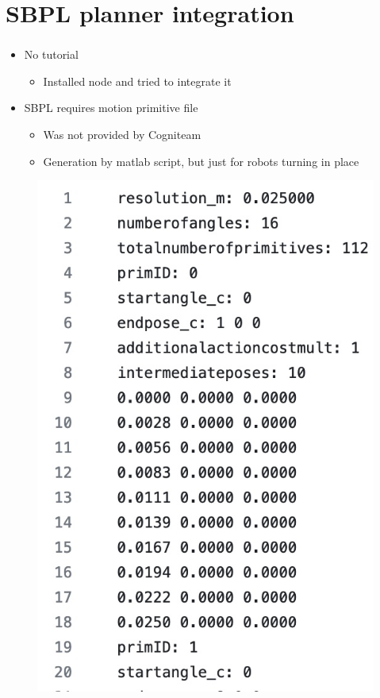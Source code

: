 \documentclass[numberofslides]{AMSBeamer}
\begin{document}
\section{SBPL planner integration}
\begin{frame}[label=agenda]
	\frametitle{\insertsectionhead}%
    \begin{minipage}{0.7\textwidth}
        \begin{itemize}
            \item No tutorial
            \begin{itemize}
                \item Installed node and tried to integrate it
            \end{itemize}
            \item SBPL requires motion primitive file
            \begin{itemize}
                \item Was not provided by Cogniteam
                \item Generation by matlab script, but just for robots turning in place
            \end{itemize}
        \end{itemize}
    \end{minipage}%
    \begin{minipage}{0.3\textwidth}
        \begin{figure}
            \includegraphics[width = \textwidth]{Presentations/LaTeX/images/mprim.jpeg}

\end{figure}
\end{minipage}
\end{frame}
\end{document}
